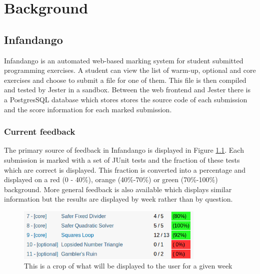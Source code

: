 \chapter{Background}
\label{background}
\section{Infandango}
Infandango is an automated web-based marking system for student submitted programming exercises. A student can view the list of warm-up, optional and core exercises and choose to submit a file for one of them. This file is then compiled and tested by Jester in a sandbox. Between the web frontend and Jester there is a PostgresSQL database which stores stores the source code of each submission and the score information for each marked submission.
\subsection{Current feedback}
The primary source of feedback in Infandango is displayed in Figure \ref{fig:currentfeedback}. Each submission is marked with a set of JUnit tests and the fraction of these tests which are correct is displayed. This fraction is converted into a percentage and displayed on a red (0 - 40\%), orange (40\%-70\%) or green (70\%-100\%) background.
More general feedback is also available which displays similar information but the results are displayed by week rather than by question. 

\begin{figure}[p]
\centering
\includegraphics[width=0.8\textwidth]{currentfeedback.png}
\caption{This is a crop of what will be displayed to the user for a given week}
\label{fig:currentfeedback}
\end{figure}

